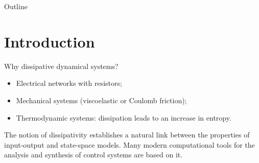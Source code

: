 \documentclass[aspectratio=169]{beamer}
\begin{document}
	
	
\begin{frame}[plain]
	
	
	
\end{frame}
	
	
\begin{frame}{Outline}
	
	\tableofcontents
	
\end{frame}

\section{Introduction}

\begin{frame}{Why dissipative dynamical systems?}

\begin{tcolorbox}[width=0.95\textwidth, nobeforeafter, colframe=theme,title=All engineering systems exhibit dissipation.]
\begin{itemize}
	\item Electrical networks with resistors;
	\item Mechanical systems (viscoelastic or Coulomb friction);
	\item Thermodynamic systems: dissipation leads to an increase in entropy.
\end{itemize}
\end{tcolorbox}
The notion of dissipativity establishes a natural link between the properties of input-output and state-space models. Many modern computational tools for the analysis and synthesis of control systems  are based on it.
\vspace{.3cm}

\footnotesize{
\\
\\
\cite{schaft1999l2}}

\end{frame}
\end{document}
